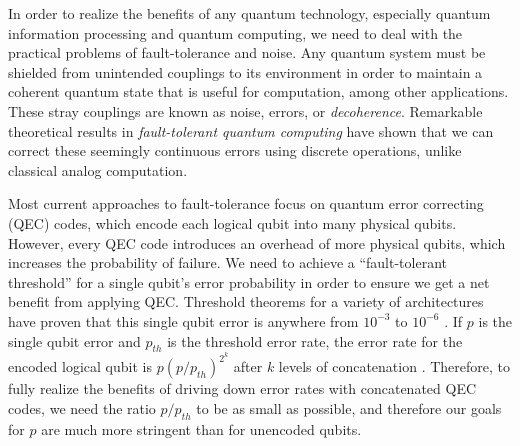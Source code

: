 \documentclass{article}
\begin{document}

In order to realize the benefits of any quantum technology, especially
quantum information processing and quantum computing, we need to deal with the
practical problems of fault-tolerance and noise.
Any quantum system must be shielded from
unintended couplings to its environment in order to maintain a coherent 
quantum state that is useful for computation, among other applications.
These stray couplings are
known as noise, errors, or {\em decoherence}. Remarkable theoretical results in
{\em fault-tolerant quantum computing} have shown that we can correct these
seemingly continuous errors using discrete operations, unlike classical
analog computation.

Most current approaches to fault-tolerance focus on
quantum error correcting (QEC) codes, which encode
each logical qubit into many physical qubits. However, every QEC code introduces
an overhead of more physical qubits, which increases the probability of
failure. We need to achieve a ``fault-tolerant threshold'' for a single qubit's
error probability in order to ensure we get a net benefit from applying QEC.
Threshold theorems for a variety of architectures have proven that this single
qubit error is anywhere from $10^{-3}$ to $10^{-6}$ \cite{NC2000}.
If $p$ is the single qubit error and $p_{th}$ is the threshold error rate,
the error rate for the encoded logical qubit is $p(p/p_{th})^{2^k}$ after
$k$ levels of concatenation \cite{NC2000}.
Therefore, to fully realize the benefits of driving down error rates with
concatenated QEC codes, we need the ratio $p/p_{th}$ to be as small as possible,
and therefore our goals for $p$ are much more stringent than for unencoded
qubits.
\end{document}
